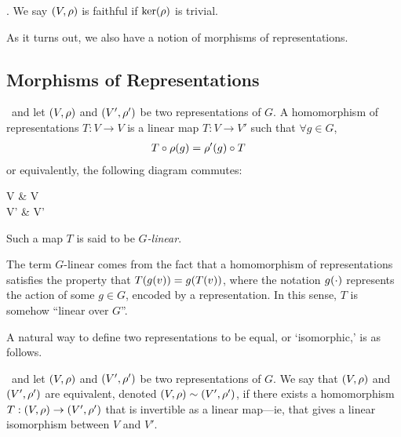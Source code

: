 \begin{definition}[Faithfulness]
    . We say $\left( V, \rho \right)$ is faithful if $\operatorname{ker}\!\left( \rho \right)$ is trivial.
\end{definition}

As it turns out, we also have a notion of morphisms of representations.

\subsection{Morphisms of Representations}

\begin{boxdefinition}
    \ and let $\left( V,\rho \right)$ and $\left( V',\rho' \right)$ be two representations of $G$. A homomorphism of representations $T : V \to V$ is a linear map $T : V \to V'$ such that $\forall g \in G$,
    \begin{align*}
        T \circ \rho\!\left( g \right) &= \rho'(g) \circ T
    \end{align*}
    or equivalently, the following diagram commutes:
    \begin{cd}
        V \arrow[r, "\rho(g)"] \arrow[d, "T"'] & V \arrow[d, "T"] \\
        V' \arrow[r, "\rho'(g)"'] & V'
        \label{Ch1:eq:cd_rep_map}
    \end{cd}
    Such a map $T$ is said to be \textit{$G$-linear}.
\end{boxdefinition}

\begin{remark}
    The term $G$-linear comes from the fact that a homomorphism of representations satisfies the property that $T\!\left( g(v) \right) = g\!\left( T\!\left( v \right) \right)$, where the notation $g\!\left( \cdot \right)$ represents the action of some $g \in G$, encoded by a representation. In this sense, $T$ is somehow ``linear over $G$''.
\end{remark}

A natural way to define two representations to be equal, or `isomorphic,' is as follows.

\begin{definition}
    \ and let $\left( V,\rho \right)$ and $\left( V',\rho' \right)$ be two representations of $G$. We say that $\left( V,\rho \right)$ and $\left( V',\rho' \right)$ are equivalent, denoted $\left( V,\rho \right) \sim \left( V',\rho' \right)$, if there exists a homomorphism $T : \left( V,\rho \right) \to \left( V',\rho' \right)$ that is invertible as a linear map---ie, that gives a linear isomorphism between $V$ and $V'$.
\end{definition}

